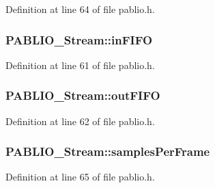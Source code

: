 Definition at line 64 of file pablio.\+h.

\subsubsection[{\texorpdfstring{in\+F\+I\+FO}{inFIFO}}]{ P\+A\+B\+L\+I\+O\+\_\+\+Stream\+::in\+F\+I\+FO}\hypertarget{struct_p_a_b_l_i_o___stream_a9e71b0fedc0c6eb9617f7fbcd533e900}{}\label{struct_p_a_b_l_i_o___stream_a9e71b0fedc0c6eb9617f7fbcd533e900}


Definition at line 61 of file pablio.\+h.

\subsubsection[{\texorpdfstring{out\+F\+I\+FO}{outFIFO}}]{ P\+A\+B\+L\+I\+O\+\_\+\+Stream\+::out\+F\+I\+FO}\hypertarget{struct_p_a_b_l_i_o___stream_a6bb74b5a753c8bd75f8e352edac68fcc}{}\label{struct_p_a_b_l_i_o___stream_a6bb74b5a753c8bd75f8e352edac68fcc}


Definition at line 62 of file pablio.\+h.

\subsubsection[{\texorpdfstring{samples\+Per\+Frame}{samplesPerFrame}}]{ P\+A\+B\+L\+I\+O\+\_\+\+Stream\+::samples\+Per\+Frame}\hypertarget{struct_p_a_b_l_i_o___stream_aa60b21938c04f7836a235a33ad27e0d3}{}\label{struct_p_a_b_l_i_o___stream_aa60b21938c04f7836a235a33ad27e0d3}


Definition at line 65 of file pablio.\+h.

